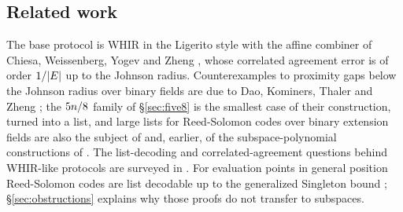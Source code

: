 \subsection{Related work}

The base protocol is WHIR \cite{ACFY25} in the Ligerito style \cite{NA25} with the affine combiner of Chiesa, Weissenberg, Yogev and Zheng \cite{CWYZ26}, whose correlated agreement error is of order $1/|E|$ up to the Johnson radius. Counterexamples to proximity gaps below the Johnson radius over binary fields are due to Dao, Kominers, Thaler and Zheng \cite{DKTZ26}; the $5n/8$ family of \S\ref{sec:five8} is the smallest case of their construction, turned into a list, and large lists for Reed-Solomon codes over binary extension fields are also the subject of \cite{Zhu26} and, earlier, of the subspace-polynomial constructions of \cite{BKR06}. The list-decoding and correlated-agreement questions behind WHIR-like protocols are surveyed in \cite{ABF26}. For evaluation points in general position Reed-Solomon codes are list decodable up to the generalized Singleton bound \cite{BGM}; \S\ref{sec:obstructions} explains why those proofs do not transfer to subspaces.
